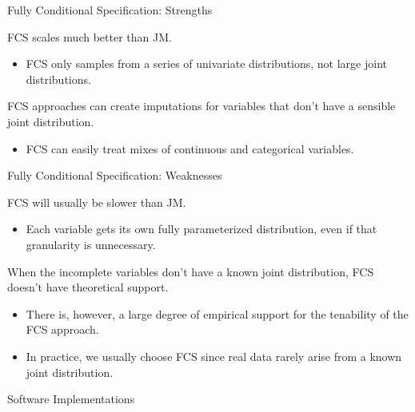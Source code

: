 \documentclass[10pt]{beamer}\usepackage[]{graphicx}\usepackage[]{color}
\begin{document}

\begin{frame}{Fully Conditional Specification: Strengths}
  
  FCS scales much better than JM.
  \vc
  \begin{itemize}
  \item FCS only samples from a series of univariate distributions, not large 
    joint distributions.
  \end{itemize}
  \va 
  FCS approaches can create imputations for variables that don't have a sensible 
  joint distribution.
  \vc
  \begin{itemize}
  \item FCS can easily treat mixes of continuous and categorical variables.
  \end{itemize}
  
\end{frame}


\begin{frame}{Fully Conditional Specification: Weaknesses}

  FCS will usually be slower than JM.
  \vc
  \begin{itemize}
  \item Each variable gets its own fully parameterized distribution, even if 
    that granularity is unnecessary.
  \end{itemize}
  \va
  When the incomplete variables don't have a known joint distribution, FCS 
  doesn't have theoretical support.
  \vc
  \begin{itemize}
  \item There is, however, a large degree of empirical support for the 
    tenability of the FCS approach.
  \item In practice, we usually choose FCS since real data rarely arise from a 
    known joint distribution.
  \end{itemize}
  
\end{frame}
  

\begin{frame}{Software Implementations}
  
\end{frame}
\end{document}
